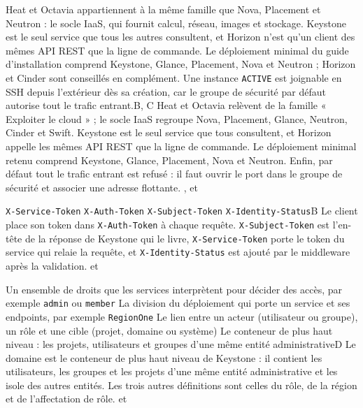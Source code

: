   {Heat et Octavia appartiennent à la même famille que Nova, Placement et Neutron : le socle IaaS, qui fournit calcul, réseau, images et stockage.}
  {Keystone est le seul service que tous les autres consultent, et Horizon n'est qu'un client des mêmes API REST que la ligne de commande.}
  {Le déploiement minimal du guide d'installation comprend Keystone, Glance, Placement, Nova et Neutron ; Horizon et Cinder sont conseillés en complément.}
  {Une instance \texttt{ACTIVE} est joignable en SSH depuis l'extérieur dès sa création, car le groupe de sécurité par défaut autorise tout le trafic entrant.}{B, C}
  {Heat et Octavia relèvent de la famille « Exploiter le cloud » ; le socle IaaS regroupe Nova, Placement, Glance, Neutron, Cinder et Swift. Keystone est le seul service que tous consultent, et Horizon appelle les mêmes API REST que la ligne de commande. Le déploiement minimal retenu comprend Keystone, Glance, Placement, Nova et Neutron. Enfin, par défaut tout le trafic entrant est refusé : il faut ouvrir le port dans le groupe de sécurité et associer une adresse flottante.}
  {,  et }


  {\texttt{X-Service-Token}}
  {\texttt{X-Auth-Token}}
  {\texttt{X-Subject-Token}}
  {\texttt{X-Identity-Status}}{B}
  {Le client place son token dans \texttt{X-Auth-Token} à chaque requête. \texttt{X-Subject-Token} est l'en-tête de la réponse de Keystone qui le livre, \texttt{X-Service-Token} porte le token du service qui relaie la requête, et \texttt{X-Identity-Status} est ajouté par le middleware après la validation.}
  { et }

  {Un ensemble de droits que les services interprètent pour décider des accès, par exemple \texttt{admin} ou \texttt{member}}
  {La division du déploiement qui porte un service et ses endpoints, par exemple \texttt{RegionOne}}
  {Le lien entre un acteur (utilisateur ou groupe), un rôle et une cible (projet, domaine ou système)}
  {Le conteneur de plus haut niveau : les projets, utilisateurs et groupes d'une même entité administrative}{D}
  {Le domaine est le conteneur de plus haut niveau de Keystone : il contient les utilisateurs, les groupes et les projets d'une même entité administrative et les isole des autres entités. Les trois autres définitions sont celles du rôle, de la région et de l'affectation de rôle.}
  { et }

